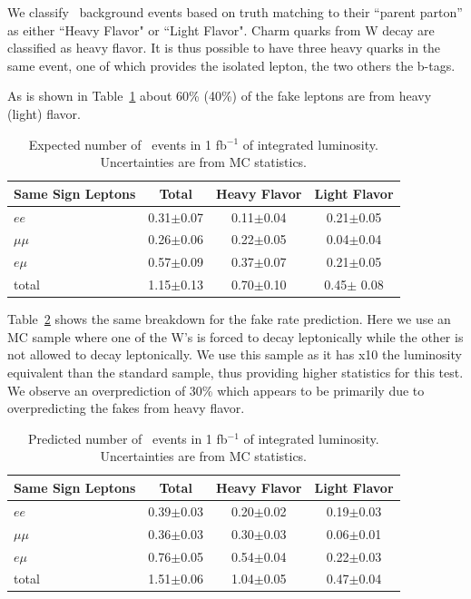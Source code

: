 We classify \ttbar\ background events based on truth matching to their ``parent parton''
as either ``Heavy Flavor" or ``Light Flavor". Charm quarks from W decay are classified as heavy flavor.
It is thus possible to have three heavy quarks in the same event, one of which provides the isolated lepton,
the two others the b-tags.

As is shown in Table~\ref{tab:fakeOrigin1}  about 60\% (40\%) of the fake leptons are from heavy (light) flavor.


\begin{table}[hbt]
\begin{center}
\begin{tabular}{|l|c|c|c|}\hline
Same Sign Leptons & Total  & Heavy Flavor & Light Flavor  \\ \hline

$ee$ & 0.31$\pm$0.07 &  0.11$\pm$0.04 & 0.21$\pm$0.05  \\
$\mu\mu$ & 0.26$\pm$0.06 & 0.22$\pm$0.05 & 0.04$\pm$0.04 \\
$e\mu$ & 0.57$\pm$0.09 & 0.37$\pm$0.07 & 0.21$\pm$0.05 \\
total & 1.15$\pm$0.13 & 0.70$\pm$0.10 & 0.45$\pm$ 0.08 \\ \hline
\end{tabular}
\caption{ Expected number of \ttbar\ events in 1 fb$^{-1}$ of integrated luminosity. Uncertainties are from MC statistics.\label{tab:fakeOrigin1}}
\end{center}
\end{table}

Table~\ref{tab:fakeOrigin2} shows the same breakdown for the fake rate prediction.
Here we use an MC sample where one of the W's is forced to decay leptonically while the other is not allowed to decay
leptonically.
We use this sample as it has x10 the luminosity equivalent than the standard \ttbar sample, thus providing higher statistics for 
this test. We observe an overprediction of 30\% which appears to be primarily due to overpredicting the fakes from heavy flavor.

\begin{table}[hbt]
\begin{center}
\begin{tabular}{|l|c|c|c|}\hline
Same Sign Leptons & Total &  Heavy Flavor & Light Flavor\\ \hline
$ee$ & 0.39$\pm$0.03 & 0.20$\pm$0.02 & 0.19$\pm$0.03 \\
$\mu\mu$ & 0.36$\pm$0.03 & 0.30$\pm$0.03 & 0.06$\pm$0.01 \\
$e\mu$ & 0.76$\pm$0.05 & 0.54$\pm$0.04 & 0.22$\pm$0.03 \\
total & 1.51$\pm$0.06 & 1.04$\pm$0.05 & 0.47$\pm$0.04  \\ \hline
\end{tabular}
\caption{ Predicted number of \ttbar\ events in 1 fb$^{-1}$ of integrated luminosity. Uncertainties are from MC statistics.\label{tab:fakeOrigin2}}
\end{center}
\end{table}

